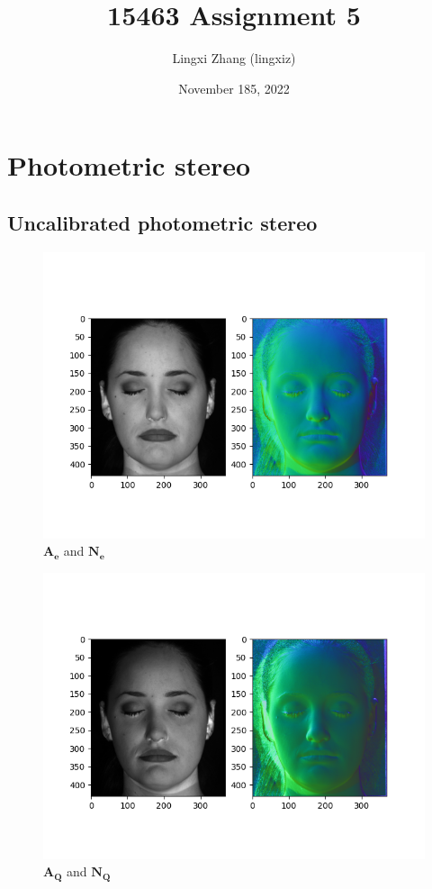 \documentclass{article}
\title{15463 Assignment 5}
\author{Lingxi Zhang (lingxiz)}
\date{November 185, 2022}
\begin{document}
\maketitle

\section{Photometric stereo}
\subsection{Uncalibrated photometric stereo}
\begin{figure}[ht]
    \centering
    \includegraphics[scale=0.8]{../data/output/default.png}
    \caption{$\mathbf{A_e}$ and $\mathbf{N_e}$}
\end{figure}
\begin{figure}[ht]
    \centering
    \includegraphics[scale=0.8]{../data/output/Q.png}
    \caption{$\mathbf{A_Q}$ and $\mathbf{N_Q}$}
\end{figure}
\end{document}
